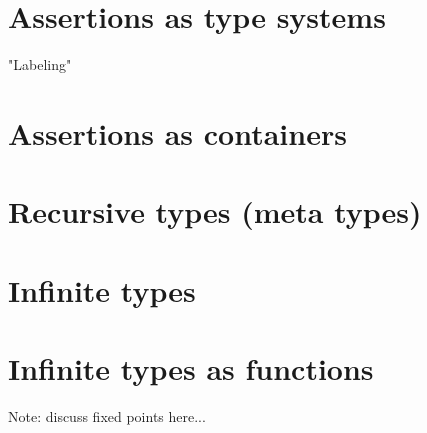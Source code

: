 \documentclass[11pt]{article}
\begin{document}











\section*{Assertions as type systems}
"Labeling"

\section*{Assertions as containers}

\section*{Recursive types (meta types)}

\section*{Infinite types}

\section*{Infinite types as functions}
Note: discuss fixed points here...
\end{document}
